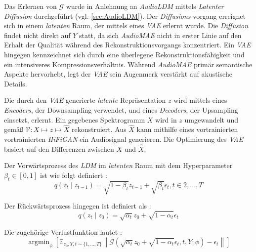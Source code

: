 \documentclass[
  a4paper,  %
  twoside,  %
  bibliography=totoc,
  headsepline,
  cleardoublepage=empty,
  parskip=half,
  draft=false
]{scrbook}
\begin{document}
{Das Erlernen von $\mathcal{G}$ wurde in Anlehnung an \emph{AudioLDM} \cite{liu_audioldm_2023} mittels \emph{Latenter Diffusion} \cite{rombach_high-resolution_2022} durchgeführt (vgl. \ref{sec:AudioLDM}). Der \emph{Diffusions}-vorgang erreignet sich in einem \emph{latenten} Raum, der mittels eines \emph{VAE} \cite{kingma_auto-encoding_2022} erlernt wurde. Die \emph{Diffusion} findet nicht direkt auf $Y$ statt, da sich \emph{AudioMAE} nicht in erster Linie auf den Erhalt der Qualität während des Rekonstruktionsvorgangs konzentriert. Ein \emph{VAE} hingegen kennzeichnet sich durch eine überlegene Rekonstruktionsfähigkeit und ein intensiveres Kompressionsverhältnis. Während \emph{AudioMAE} primär semantische Aspekte hervorhebt, legt der \emph{VAE} sein Augenmerk verstärkt auf akustische Details. \cite{liu_audioldm2_2023}

Die durch den \emph{VAE} generierte \emph{latente} Repräsentation $z$ wird mittels eines \emph{Encoders}, der Downsampling verwendet, und eines \emph{Decoders}, der Upsampling einsetzt, erlernt. Ein gegebenes Spektrogramm $X$ wird in $z$ umgewandelt und gemäß $\mathcal{V}: X \mapsto z \mapsto \hat{X}$ rekonstruiert. Aus $\hat{X}$ kann mithilfe eines vortrainierten vortrainierten \emph{HiFiGAN} \cite{kong_hifi-gan_2020} ein Audiosignal generieren. Die Optimierung des \emph{VAE} basiert auf den Differenzen zwischen $X$ und $\hat{X}$. \cite{liu_audioldm2_2023}

Der Vorwärtsprozess des \emph{LDM} im \emph{latenten} Raum mit dem Hyperparameter $\beta_t \in[0,1]$ ist wie folgt definiert \cite{liu_audioldm2_2023}:
\begin{equation}
    q\left(z_t \mid z_{t-1}\right)=\sqrt{1-\beta_t} z_{t-1}+\sqrt{\beta_t} \epsilon_t, t \in 2, \ldots, T
\end{equation}

Der Rückwärtsprozess hingegen ist definiert als \cite{liu_audioldm2_2023}:
\begin{equation}
q\left(z_t \mid z_0\right)=\sqrt{\alpha_t} z_0+\sqrt{1-\alpha_t} \epsilon_t
\end{equation}

Die zugehörige Verlustfunktion lautet \cite{liu_audioldm2_2023}:
\begin{equation}
\operatorname{argmin}_\phi\left[\mathbb{E}_{z_0, Y, t \sim\{1, \ldots, T\}}\left\|\mathcal{G}\left(\sqrt{\alpha_t} z_0+\sqrt{1-\alpha_t} \epsilon_t, t, Y ; \phi\right)-\epsilon_t\right\|\right]
\end{equation}

}
\end{document}
